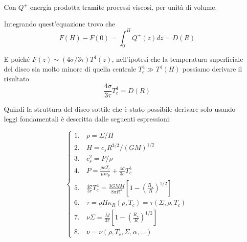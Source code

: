 \documentclass[a4paperbi]{article}
\begin{document}
	Con $Q^+$ energia prodotta tramite processi viscosi, per unità di volume.
	
	Integrando quest'equazione trovo che
	\begin{equation}
		F(H)-F(0)=\int_0^HQ^+(z)dz=D(R)
	\end{equation}

	E poiché $F(z)\sim(4\sigma/3\tau)T^4(z)$, nell'ipotesi che la temperatura superficiale del disco sia molto minore di quella centrale $T_c^4\gg T^4(H)$
	possiamo derivare il risultato
	\begin{equation}
		\frac{4\sigma}{3\tau}T^4_c=D(R)
	\end{equation}
	
	\newpage
	Quindi la struttura del disco sottile che è stato possibile derivare solo usando leggi fondamentali è descritta dalle seguenti espressioni:
	
	\begin{spacing}{1.3}
	\begin{equation}\label{eq: SistemaStazionario}
	\begin{cases}
		1.\quad \rho=\Sigma/H\\
		2.\quad H=c_sR^{3/2}/(GM)^{1/2}\\
		3.\quad c_s^2=P/\rho\\
		4.\quad P=\frac{\rho\kappa T_c}{\mu m_p}+\frac{4\sigma}{3c}T_c^4\\
		5.\quad \frac{4\sigma}{3\tau}T^4_c=\frac{3GM\dot{M}}{8\pi R^3}\left[1-\left(\frac{R_{\star}}{R}\right)^{1/2}\right]\\
		6.\quad \tau=\rho H\kappa_R(\rho,T_c)=\tau(\Sigma,\rho,T_c)\\
		7.\quad \nu\Sigma=\frac{\dot{M}}{3\pi}\left[1-\left(\frac{R_{\star}}{R}\right)^{1/2}\right]\\
		8.\quad \nu=\nu(\rho,T_c,\Sigma,\alpha,...)		
	\end{cases}
	\end{equation}
	\end{spacing}
		
\end{document}
